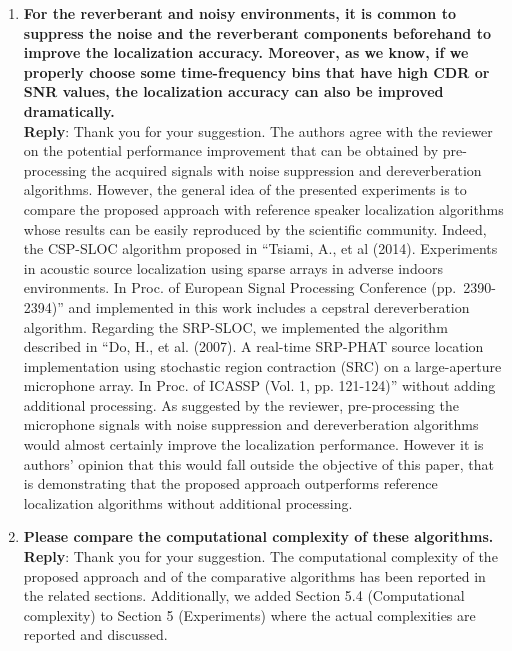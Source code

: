 \documentclass[11pt, technote, letterpaper, oneside, onecolumn]{IEEEtran}
\begin{document}
\begin{enumerate}
\item  \textbf{For the reverberant and noisy environments, it is common to suppress the noise and the reverberant components beforehand to improve the localization accuracy. Moreover, as we know, if we properly choose some time-frequency bins that have high CDR or SNR values, the localization accuracy can also be improved dramatically.\\}
\textbf{Reply}: Thank you for your suggestion. The authors agree with the reviewer on the potential performance improvement that can be obtained by pre-processing the acquired signals with noise suppression and dereverberation algorithms. However, the general idea of the presented experiments is to compare the proposed approach with reference speaker localization algorithms whose results can be easily reproduced by the scientific community. Indeed, the CSP-SLOC algorithm proposed in  ``Tsiami, A., et al (2014). Experiments in acoustic source localization using sparse arrays in adverse indoors environments. In Proc. of European Signal Processing Conference (pp.\ 2390-2394)'' and implemented in this work includes a cepstral dereverberation algorithm. Regarding the SRP-SLOC, we implemented the algorithm described in ``Do, H., et al. (2007). A real-time SRP-PHAT source location implementation using stochastic region contraction (SRC) on a large-aperture microphone array. In Proc. of ICASSP (Vol. 1, pp. 121-124)'' without adding additional processing. As suggested by the reviewer, pre-processing the microphone signals with noise suppression and dereverberation algorithms would almost certainly improve the localization performance. However it is authors' opinion that this would fall outside the objective of this paper, that is demonstrating that the proposed approach outperforms reference localization algorithms without additional processing.  %


\item  \textbf{Please compare the computational complexity of these algorithms.\\}
\textbf{Reply}: Thank you for your suggestion. The computational complexity of the proposed approach and of the comparative algorithms has been reported in the related sections. Additionally, we added Section 5.4 (Computational complexity) to Section 5 (Experiments) where the actual complexities are reported and discussed.

\end{enumerate}
\end{document}
